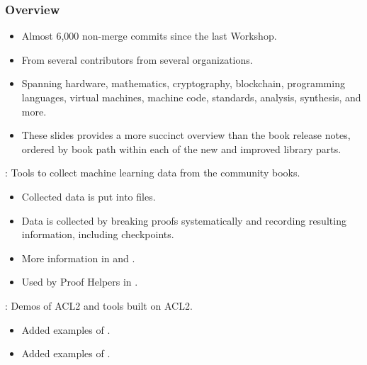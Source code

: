 \begin{frame}

\frametitle{Overview}
      
\begin{itemize}
\item Almost 6,000 non-merge commits since the last Workshop.
\item From several contributors from several organizations.
\item Spanning hardware, mathematics, cryptography, blockchain,
      programming languages, virtual machines, machine code,
      standards, analysis, synthesis, and more.
\item These slides provides
      a more succinct overview than the book release notes,
      ordered by book path within each of the new and improved library parts.
\end{itemize}
      
\end{frame}


\begin{frame}

\newlibtitle

:
Tools to collect machine learning data from the community books.
\begin{itemize}
\item Collected data is put into  files.
\item Data is collected by breaking proofs systematically
      and recording resulting information, including checkpoints.
\item More information in  and  .
\item Used by Proof Helpers in .
\end{itemize}

\end{frame}


\begin{frame}

\implibtitle

:
Demos of ACL2 and tools built on ACL2.
\begin{itemize}
\item Added examples of .
\item Added examples of .
\end{itemize}
\end{frame}

